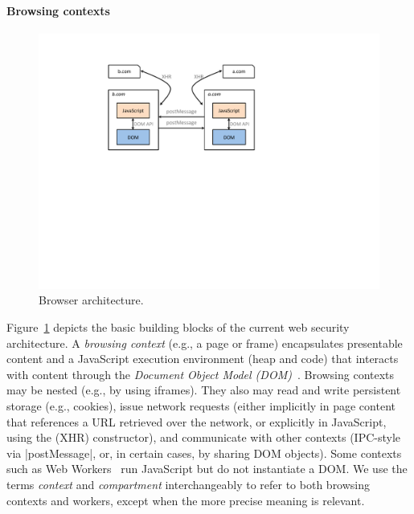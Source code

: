 \paragraph{Browsing contexts}
\iffigures
\begin{figure}
\begin{center}
\includegraphics[width=\columnwidth]{arch.pdf}
\end{center}
\vspace{-10pt}
\caption{\label{fig:primer-browser-arch} Browser
architecture.}
\vspace{-10pt}
\end{figure}
Figure~\ref{fig:primer-browser-arch} depicts the basic building blocks of
the current web security architecture.
%
%
A \emph{browsing context} (e.g., a page or frame) encapsulates
presentable content and a JavaScript execution environment (heap and
code) that interacts with content through the \emph{Document Object
  Model (DOM)}~\cite{html5}.
%
Browsing contexts may be nested (e.g., by using iframes).
%
They also may read and write persistent storage (e.g., cookies), issue
network requests (either implicitly in page content that references a
URL retrieved over the network, or explicitly in JavaScript, using the
\xhr{} (XHR) constructor), and communicate with other contexts
(IPC-style via \js|postMessage|, or, in certain cases, by sharing
DOM objects).
%
Some contexts such as Web Workers~\cite{workers} run JavaScript but do not instantiate a
DOM. We use the terms \emph{context} and \emph{compartment}
interchangeably to refer to both browsing contexts and workers, except when
the more precise meaning is relevant.

